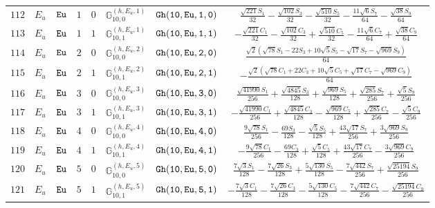 \documentclass[fleqn,8pt]{jsarticle}
\begin{document}
\begin{table}[ht!]
\begin{center}
\begin{tabular}{cccccccc}
$ 112 $ & $ E_{u} $ & $ {\tt Eu} $ & $ 1 $ & $ 0 $ & $ \mathbb{G}_{10,0}^{(h,E_{u},1)} $ & $ {\tt Gh(10,Eu,1,0)} $ & $ \frac{\sqrt{221} S_{1}}{32} - \frac{\sqrt{102} S_{3}}{32} - \frac{\sqrt{510} S_{5}}{32} - \frac{11 \sqrt{6} S_{7}}{64} - \frac{\sqrt{38} S_{9}}{64} $ \\
$ 113 $ & $ E_{u} $ & $ {\tt Eu} $ & $ 1 $ & $ 1 $ & $ \mathbb{G}_{10,1}^{(h,E_{u},1)} $ & $ {\tt Gh(10,Eu,1,1)} $ & $ - \frac{\sqrt{221} C_{1}}{32} - \frac{\sqrt{102} C_{3}}{32} + \frac{\sqrt{510} C_{5}}{32} - \frac{11 \sqrt{6} C_{7}}{64} + \frac{\sqrt{38} C_{9}}{64} $ \\
$ 114 $ & $ E_{u} $ & $ {\tt Eu} $ & $ 2 $ & $ 0 $ & $ \mathbb{G}_{10,0}^{(h,E_{u},2)} $ & $ {\tt Gh(10,Eu,2,0)} $ & $ \frac{\sqrt{2} \left(\sqrt{78} S_{1} - 22 S_{3} + 10 \sqrt{5} S_{5} - \sqrt{17} S_{7} - \sqrt{969} S_{9}\right)}{64} $ \\
$ 115 $ & $ E_{u} $ & $ {\tt Eu} $ & $ 2 $ & $ 1 $ & $ \mathbb{G}_{10,1}^{(h,E_{u},2)} $ & $ {\tt Gh(10,Eu,2,1)} $ & $ - \frac{\sqrt{2} \left(\sqrt{78} C_{1} + 22 C_{3} + 10 \sqrt{5} C_{5} + \sqrt{17} C_{7} - \sqrt{969} C_{9}\right)}{64} $ \\
$ 116 $ & $ E_{u} $ & $ {\tt Eu} $ & $ 3 $ & $ 0 $ & $ \mathbb{G}_{10,0}^{(h,E_{u},3)} $ & $ {\tt Gh(10,Eu,3,0)} $ & $ \frac{\sqrt{41990} S_{1}}{256} + \frac{\sqrt{4845} S_{3}}{128} + \frac{\sqrt{969} S_{5}}{128} + \frac{\sqrt{285} S_{7}}{256} + \frac{\sqrt{5} S_{9}}{256} $ \\
$ 117 $ & $ E_{u} $ & $ {\tt Eu} $ & $ 3 $ & $ 1 $ & $ \mathbb{G}_{10,1}^{(h,E_{u},3)} $ & $ {\tt Gh(10,Eu,3,1)} $ & $ - \frac{\sqrt{41990} C_{1}}{256} + \frac{\sqrt{4845} C_{3}}{128} - \frac{\sqrt{969} C_{5}}{128} + \frac{\sqrt{285} C_{7}}{256} - \frac{\sqrt{5} C_{9}}{256} $ \\
$ 118 $ & $ E_{u} $ & $ {\tt Eu} $ & $ 4 $ & $ 0 $ & $ \mathbb{G}_{10,0}^{(h,E_{u},4)} $ & $ {\tt Gh(10,Eu,4,0)} $ & $ \frac{9 \sqrt{78} S_{1}}{256} - \frac{69 S_{3}}{128} - \frac{\sqrt{5} S_{5}}{128} + \frac{43 \sqrt{17} S_{7}}{256} + \frac{3 \sqrt{969} S_{9}}{256} $ \\
$ 119 $ & $ E_{u} $ & $ {\tt Eu} $ & $ 4 $ & $ 1 $ & $ \mathbb{G}_{10,1}^{(h,E_{u},4)} $ & $ {\tt Gh(10,Eu,4,1)} $ & $ - \frac{9 \sqrt{78} C_{1}}{256} - \frac{69 C_{3}}{128} + \frac{\sqrt{5} C_{5}}{128} + \frac{43 \sqrt{17} C_{7}}{256} - \frac{3 \sqrt{969} C_{9}}{256} $ \\
$ 120 $ & $ E_{u} $ & $ {\tt Eu} $ & $ 5 $ & $ 0 $ & $ \mathbb{G}_{10,0}^{(h,E_{u},5)} $ & $ {\tt Gh(10,Eu,5,0)} $ & $ \frac{7 \sqrt{3} S_{1}}{128} - \frac{7 \sqrt{26} S_{3}}{128} + \frac{5 \sqrt{130} S_{5}}{128} - \frac{7 \sqrt{442} S_{7}}{256} + \frac{\sqrt{25194} S_{9}}{256} $ \\
$ 121 $ & $ E_{u} $ & $ {\tt Eu} $ & $ 5 $ & $ 1 $ & $ \mathbb{G}_{10,1}^{(h,E_{u},5)} $ & $ {\tt Gh(10,Eu,5,1)} $ & $ - \frac{7 \sqrt{3} C_{1}}{128} - \frac{7 \sqrt{26} C_{3}}{128} - \frac{5 \sqrt{130} C_{5}}{128} - \frac{7 \sqrt{442} C_{7}}{256} - \frac{\sqrt{25194} C_{9}}{256} $ \\
 \hline \hline
\end{tabular}
\end{center}
\end{table}
\end{document}
